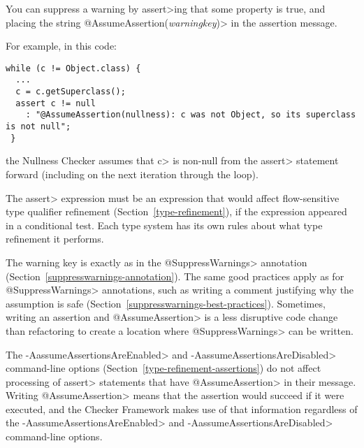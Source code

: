 \begin{sloppypar}
You can suppress a warning by \<assert>ing that some property is true, and
placing the string \<@AssumeAssertion(\emph{warningkey})> in the assertion
message.
\end{sloppypar}

For example, in this code:

\begin{Verbatim}
while (c != Object.class) {
  ...
  c = c.getSuperclass();
  assert c != null
    : "@AssumeAssertion(nullness): c was not Object, so its superclass is not null";
 }
\end{Verbatim}

\noindent
the Nullness Checker assumes that \<c> is non-null from the \<assert>
statement forward (including on the next iteration through the loop).

The \<assert> expression must be an expression that would affect flow-sensitive
type qualifier refinement (Section~\ref{type-refinement}), if the
expression appeared in a conditional test.  Each type system has its own
rules about what type refinement it performs.

The warning key is exactly as in the \<@SuppressWarnings> annotation
(Section~\ref{suppresswarnings-annotation}).  The same good practices apply
as for \<@SuppressWarnings> annotations, such as writing a comment
justifying why the assumption is safe
(Section~\ref{suppresswarnings-best-practices}).
Sometimes, writing an assertion and \<@AssumeAssertion> is a less
disruptive code change than refactoring to create a location where
\<@SuppressWarnings> can be written.

The \<-AassumeAssertionsAreEnabled> and \<-AassumeAssertionsAreDisabled>
command-line options (Section~\ref{type-refinement-assertions}) do not
affect processing of \<assert> statements that have \<@AssumeAssertion> in
their message.  Writing \<@AssumeAssertion> means that the assertion would
succeed if it were executed, and the Checker Framework makes use of that
information regardless of the \<-AassumeAssertionsAreEnabled> and
\<-AassumeAssertionsAreDisabled> command-line options.




